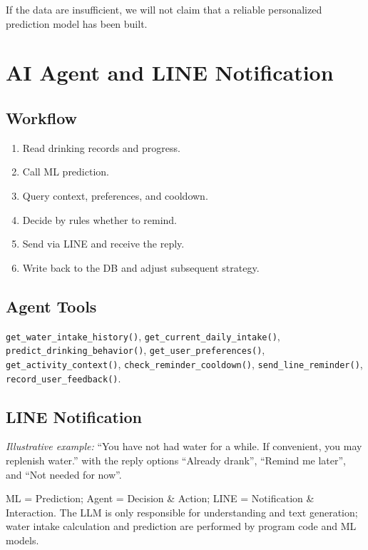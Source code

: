 \documentclass[conference]{IEEEtran}
\begin{document}
If the data are insufficient, we will not claim that a reliable personalized prediction model has been built.

\section{AI Agent and LINE Notification}\label{sec:agent}

\subsection{Workflow}
\begin{enumerate}
\item Read drinking records and progress.
\item Call ML prediction.
\item Query context, preferences, and cooldown.
\item Decide by rules whether to remind.
\item Send via LINE and receive the reply.
\item Write back to the DB and adjust subsequent strategy.
\end{enumerate}

\subsection{Agent Tools}
\texttt{get\_water\_intake\_history()}, \texttt{get\_current\_daily\_intake()}, \texttt{predict\_drinking\_behavior()}, \texttt{get\_user\_preferences()}, \texttt{get\_activity\_context()}, \texttt{check\_reminder\_cooldown()}, \texttt{send\_line\_reminder()}, \texttt{record\_user\_feedback()}.

\subsection{LINE Notification}
\textit{Illustrative example:} ``You have not had water for a while. If convenient, you may replenish water.'' with the reply options ``Already drank'', ``Remind me later'', and ``Not needed for now''.

ML = Prediction; Agent = Decision \& Action; LINE = Notification \& Interaction. The LLM is only responsible for understanding and text generation; water intake calculation and prediction are performed by program code and ML models.

\end{document}
